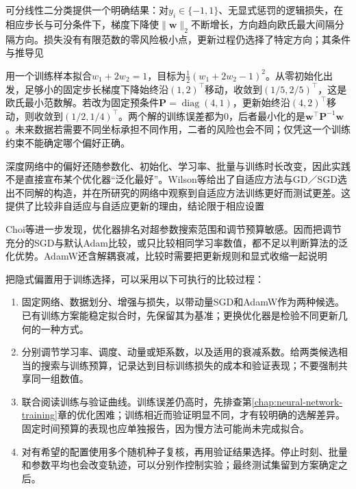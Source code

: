 可分线性二分类提供一个明确结果：对$y_i\in\{-1,1\}$、无显式惩罚的逻辑损失，在相应步长与可分条件下，梯度下降使$\lVert\bm w\rVert_2$不断增长，方向趋向欧氏最大间隔分隔方向。损失没有有限范数的零风险极小点，更新过程仍选择了特定方向；其条件与推导见

\begin{example}[改变更新几何会改变选出的解]
  \label{ex:generalization-update-geometry}
  用一个训练样本拟合$w_1+2w_2=1$，目标为$\tfrac12(w_1+2w_2-1)^2$。从零初始化出发，足够小的固定步长梯度下降始终沿$(1,2)^{\top}$移动，收敛到$(1/5,2/5)^{\top}$，这是欧氏最小范数解。若改为固定预条件$\bm P=\operatorname{diag}(4,1)$，更新始终沿$(4,2)^{\top}$移动，则收敛到$(1/2,1/4)^{\top}$。两个解的训练误差都为0，后者最小化的是$\bm w^{\top}\bm P^{-1}\bm w$。未来数据若需要不同坐标承担不同作用，二者的风险也会不同；仅凭这一个训练约束不能确定哪个偏好正确。
\end{example}

深度网络中的偏好还随参数化、初始化、学习率、批量与训练时长改变，因此实践不是直接宣布某个优化器“泛化最好”。Wilson等给出了自适应方法与GD／SGD选出不同解的构造，并在所研究的网络中观察到自适应方法训练更好而测试更差。这提供了比较非自适应与自适应更新的理由，结论限于相应设置

Choi等进一步发现，优化器排名对超参数搜索范围和调节预算敏感。因而把调节充分的SGD与默认Adam比较，或只比较相同学习率数值，都不足以判断算法的泛化优势。AdamW还含解耦衰减，比较时需要把更新规则和显式收缩一起说明

把隐式偏置用于训练选择，可以采用以下可执行的比较过程：
\begin{enumerate}
  \item 固定网络、数据划分、增强与损失，以带动量SGD和AdamW作为两种候选。已有训练方案能稳定拟合时，先保留其为基准；更换优化器是检验不同更新几何的一种方式。
  \item 分别调节学习率、调度、动量或矩系数，以及适用的衰减系数。给两类候选相当的搜索与训练预算，记录达到目标训练损失的成本和验证表现；不要强制共享同一组数值。
  \item 联合阅读训练与验证曲线。训练误差仍高时，先排查第\ref{chap:neural-network-training}章的优化困难；训练相近而验证明显不同，才有较明确的选解差异。固定时间预算的表现也应单独报告，因为慢方法可能尚未完成拟合。
  \item 对有希望的配置使用多个随机种子复核，再用验证结果选择。停止时刻、批量和参数平均也会改变轨迹，可以分别作控制实验；最终测试集留到方案确定之后。
\end{enumerate}

